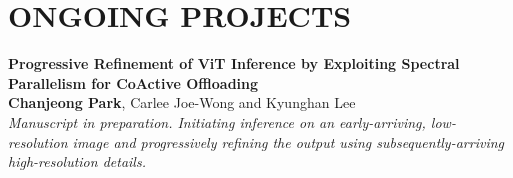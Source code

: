 \section*{ONGOING PROJECTS}

\noindent
\textbf{Progressive Refinement of ViT Inference by Exploiting Spectral Parallelism for CoActive Offloading} \\
\textbf{Chanjeong Park}, Carlee Joe-Wong and Kyunghan Lee \\[3pt]
\textit{Manuscript in preparation. Initiating inference on an early-arriving, low-resolution image and progressively refining the output using subsequently-arriving high-resolution details.} \\
